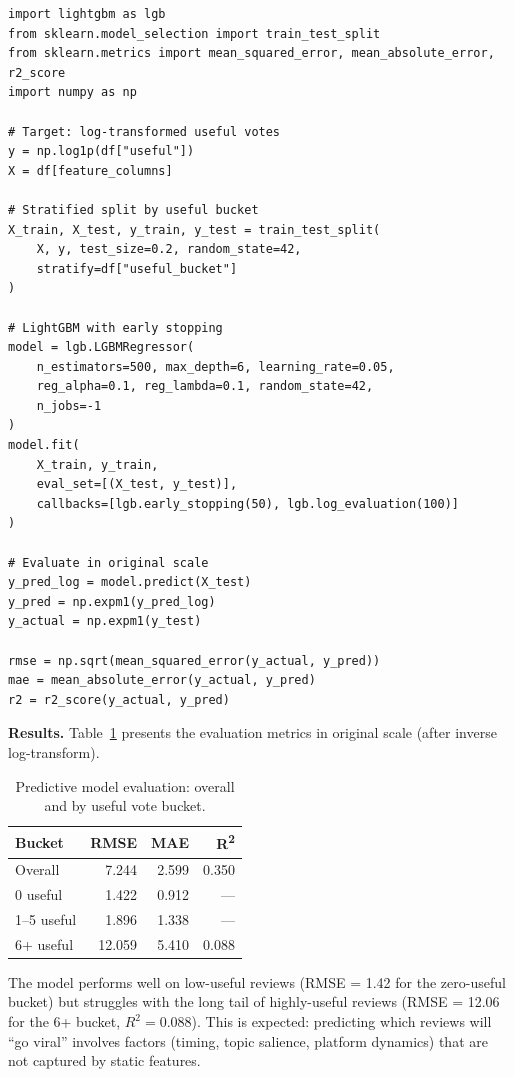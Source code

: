 \documentclass[11pt]{article}
\begin{document}
\begin{lstlisting}[style=python, caption={LightGBM model for useful vote prediction.}, label={lst:pred-model}]
import lightgbm as lgb
from sklearn.model_selection import train_test_split
from sklearn.metrics import mean_squared_error, mean_absolute_error, r2_score
import numpy as np

# Target: log-transformed useful votes
y = np.log1p(df["useful"])
X = df[feature_columns]

# Stratified split by useful bucket
X_train, X_test, y_train, y_test = train_test_split(
    X, y, test_size=0.2, random_state=42,
    stratify=df["useful_bucket"]
)

# LightGBM with early stopping
model = lgb.LGBMRegressor(
    n_estimators=500, max_depth=6, learning_rate=0.05,
    reg_alpha=0.1, reg_lambda=0.1, random_state=42,
    n_jobs=-1
)
model.fit(
    X_train, y_train,
    eval_set=[(X_test, y_test)],
    callbacks=[lgb.early_stopping(50), lgb.log_evaluation(100)]
)

# Evaluate in original scale
y_pred_log = model.predict(X_test)
y_pred = np.expm1(y_pred_log)
y_actual = np.expm1(y_test)

rmse = np.sqrt(mean_squared_error(y_actual, y_pred))
mae = mean_absolute_error(y_actual, y_pred)
r2 = r2_score(y_actual, y_pred)
\end{lstlisting}

\textbf{Results.} Table~\ref{tab:pred-results} presents the evaluation metrics in original scale (after inverse log-transform).

\begin{table}[H]
\centering
\small
\caption{Predictive model evaluation: overall and by useful vote bucket.}
\label{tab:pred-results}
\begin{tabular}{l r r r}
\toprule
\rowcolor{SoftGray}
\textbf{Bucket} & \textbf{RMSE} & \textbf{MAE} & \textbf{R\textsuperscript{2}} \\
\midrule
Overall & 7.244 & 2.599 & 0.350 \\
\midrule
0 useful & 1.422 & 0.912 & --- \\
1--5 useful & 1.896 & 1.338 & --- \\
6+ useful & 12.059 & 5.410 & 0.088 \\
\bottomrule
\end{tabular}
\end{table}

The model performs well on low-useful reviews (RMSE = 1.42 for the zero-useful bucket) but struggles with the long tail of highly-useful reviews (RMSE = 12.06 for the 6+ bucket, $R^2 = 0.088$). This is expected: predicting which reviews will ``go viral'' involves factors (timing, topic salience, platform dynamics) that are not captured by static features.
\end{document}
